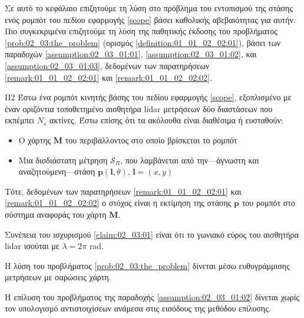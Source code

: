 Σε αυτό το κεφάλαιο επιζητούμε τη λύση στο πρόβλημα του εντοπισμού της στάσης
ενός ρομπότ του πεδίου εφαρμογής \ref{scope} βάσει καθολικής αβεβαιότητας για
αυτήν. Πιο συγκεκριμένα επιζητούμε τη λύση της παθητικής έκδοσης του προβλήματος
\ref{prob:02_03:the_problem} (ορισμός \ref{definition:01_01_02_02:01}), βάσει
των παραδοχών \ref{assumption:02_03_01:01}, \ref{assumption:02_03_01:02}, και
\ref{assumption:02_03_01:03}, δεδομένων των παρατηρήσεων
\ref{remark:01_01_02_02:01} και \ref{remark:01_01_02_02:02}.

\begin{bw_box}
\begin{customproblem}{Π2}
  \label{prob:02_03:the_problem}
  Έστω ένα ρομπότ κινητής βάσης του πεδίου εφαρμογής \ref{scope}, εξοπλισμένο με
  έναν οριζόντια τοποθετημένο αισθητήρα lidar μετρήσεων δύο διαστάσεων που
  εκπέμπει $N_s$ ακτίνες. Έστω επίσης ότι τα ακόλουθα είναι διαθέσιμα ή
  ευσταθούν:
  \begin{itemize}
    \item Ο χάρτης $\bm{M}$ του περιβάλλοντος στο οποίο βρίσκεται το ρομπότ
    \item Μια δισδιάστατη μέτρηση $\mathcal{S}_R$, που λαμβάνεται από
          την---άγνωστη και αναζητούμενη---στάση $\bm{p}(\bm{l},\theta)$,
          $\bm{l} = (x,y)$
  \end{itemize}
\end{customproblem}
Τότε, δεδομένων των παρατηρήσεων \ref{remark:01_01_02_02:01} και
\ref{remark:01_01_02_02:02} ο στόχος είναι η εκτίμηση της στάσης $\bm{p}$ του
ρομπότ στο σύστημα αναφοράς του χάρτη $\bm{M}$.
\end{bw_box}

\begin{bw_box}
  \begin{assumption}
    \label{assumption:02_03_01:01}
    Συνέπεια του ισχυρισμού \ref{claim:02_03:01} είναι ότι το γωνιακό εύρος του
    αισθητήρα lidar ισούται με $\lambda = 2\pi$ rad.
  \end{assumption}
\end{bw_box}

\begin{bw_box}
  \begin{assumption}
    \label{assumption:02_03_01:02}
    Η λύση του προβλήματος \ref{prob:02_03:the_problem} δίνεται μέσω
    ευθυγράμμισης μετρήσεων με σαρώσεις χάρτη.
  \end{assumption}
\end{bw_box}

\begin{bw_box}
  \begin{assumption}
    \label{assumption:02_03_01:03}
    Η επίλυση του προβλήματος της παραδοχής \ref{assumption:02_03_01:02}
    δίνεται χωρίς τον υπολογισμό αντιστοιχίσεων ανάμεσα στις εισόδους
    της μεθόδου επίλυσης.
  \end{assumption}
\end{bw_box}

